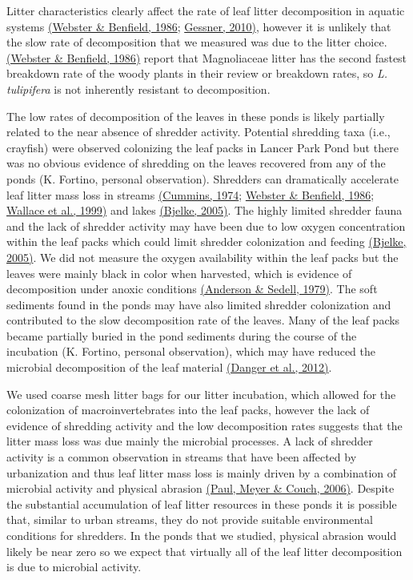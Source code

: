 \documentclass[12pt,letter]{article}
\begin{document}
Litter characteristics clearly affect the rate of leaf litter decomposition in aquatic systems \hyperref[csl:13]{(Webster \& Benfield, 1986}; \hyperref[csl:44]{Gessner, 2010)}, however it is unlikely that the slow rate of decomposition that we measured was due to the litter choice. \hyperref[csl:13]{(Webster \& Benfield, 1986)} report that Magnoliaceae litter has the second fastest breakdown rate of the woody plants in their review or breakdown rates, so \emph{L. tulipifera} is not inherently resistant to decomposition. 

The low rates of decomposition of the leaves in these ponds is likely partially related to the near absence of shredder activity. Potential shredding taxa (i.e., crayfish) were observed colonizing the leaf packs in Lancer Park Pond but there was no obvious evidence of shredding on the leaves recovered from any of the ponds (K. Fortino, personal observation). Shredders can dramatically accelerate leaf litter mass loss in streams \hyperref[csl:15]{(Cummins, 1974}; \hyperref[csl:13]{Webster \& Benfield, 1986}; \hyperref[csl:12]{Wallace et al., 1999)} and lakes \hyperref[csl:45]{(Bjelke, 2005)}. The highly limited shredder fauna and the lack of shredder activity may have been due to low oxygen concentration within the leaf packs which could limit shredder colonization and feeding \hyperref[csl:45]{(Bjelke, 2005)}. We did not measure the oxygen availability within the leaf packs but the leaves were mainly black in color when harvested, which is evidence of decomposition under anoxic conditions \hyperref[csl:46]{(Anderson \& Sedell, 1979)}. The soft sediments found in the ponds may have also limited shredder colonization and contributed to the slow decomposition rate of the leaves. Many of the leaf packs became partially buried in the pond sediments during the course of the incubation (K. Fortino, personal observation), which may have reduced the microbial decomposition of the leaf material \hyperref[csl:47]{(Danger et al., 2012)}. 

We used coarse mesh litter bags for our litter incubation, which allowed for the colonization of macroinvertebrates into the leaf packs, however the lack of evidence of shredding activity and the low decomposition rates suggests that the litter mass loss was due mainly the microbial processes.  A lack of shredder activity is a common observation in streams that have been affected by urbanization and thus leaf litter mass loss is mainly driven by a combination of microbial activity and physical abrasion \hyperref[csl:24]{(Paul, Meyer \& Couch, 2006)}. Despite the substantial accumulation of leaf litter resources in these ponds it is possible that, similar to urban streams, they do not provide suitable environmental conditions for shredders. In the ponds that we studied, physical abrasion would likely be near zero so we expect that virtually all of the leaf litter decomposition is due to microbial activity. 
\end{document}
